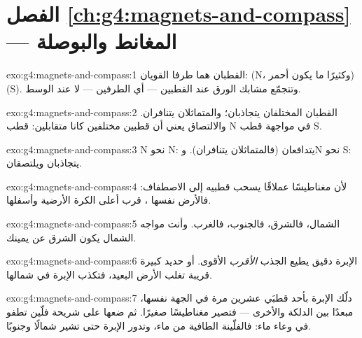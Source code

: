 \section*{الفصل \ref{ch:g4:magnets-and-compass} --- المغانط والبوصلة}

\begin{solution}{exo:g4:magnets-and-compass:1}
القطبان هما طرفا  القويان:  (N، وكثيرًا ما
يكون أحمر)  (S). وتتجمّع مشابك الورق عند القطبين
--- أي الطرفين --- لا عند الوسط.
\end{solution}

\begin{solution}{exo:g4:magnets-and-compass:2}
القطبان المختلفان يتجاذبان؛ والمتماثلان يتنافران. والالتصاق
يعني أن قطبين مختلفين كانا متقابلين: قطب N في مواجهة قطب S.
\end{solution}

\begin{solution}{exo:g4:magnets-and-compass:3}
N نحو N: يتدافعان (فالمتماثلان يتنافران). وN نحو S: يتجاذبان
ويلتصقان.
\end{solution}

\begin{solution}{exo:g4:magnets-and-compass:4}
لأن مغناطيسًا عملاقًا يسحب قطبيه إلى الاصطفاف: فالأرض نفسها
،  قرب أعلى الكرة الأرضية وأسفلها.
\end{solution}

\begin{solution}{exo:g4:magnets-and-compass:5}
الشمال، فالشرق، فالجنوب، فالغرب. وأنت مواجه الشمال يكون الشرق
عن يمينك.
\end{solution}

\begin{solution}{exo:g4:magnets-and-compass:6}
الإبرة  دقيق يطيع الجذب \emph{الأقرب} الأقوى. 
أو  حديد كبيرة قريبة تغلب  الأرض البعيد، فتكذب
الإبرة في شمالها.
\end{solution}

\begin{solution}{exo:g4:magnets-and-compass:7}
دلّك الإبرة بأحد قطبَي  عشرين مرة في الجهة نفسها، مبعدًا
 بين الدلكة والأخرى --- فتصير مغناطيسًا صغيرًا. ثم
ضعها على شريحة فلّين تطفو في وعاء ماء: فالفلّينة الطافية  من ماء، وتدور الإبرة حتى تشير شمالًا وجنوبًا.
\end{solution}

